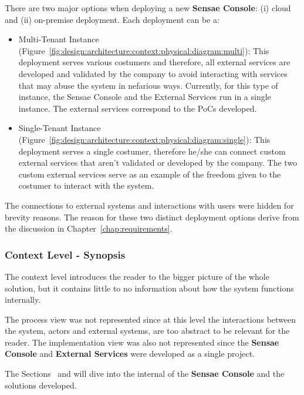 There are two major options when deploying a new \textbf{Sensae Console}: (i) cloud and (ii) on-premise deployment.
Each deployment can be a:

\begin{itemize}
   \item Multi-Tenant Instance (Figure~\ref{fig:design:architecture:context:physical:diagram:multi}): This deployment serves various costumers and therefore, all external services are developed and validated by the company to avoid interacting with services that may abuse the system in nefarious ways. Currently, for this type of instance, the Sensae Console and the External Services run in a single instance. The external services correspond to the \gls{PoC}s developed.
   \item Single-Tenant Instance (Figure~\ref{fig:design:architecture:context:physical:diagram:single}): This deployment serves a single costumer, therefore he/she can connect custom external services that aren't validated or developed by the company. The two custom external services serve as an example of the freedom given to the costumer to interact with the system. 
\end{itemize}

The connections to external systems and interactions with users were hidden for brevity reasons. The reason for these two distinct deployment options derive from the discussion in Chapter~\ref{chap:requirements}.  

\subsubsection{Context Level - Synopsis}
\label{subsubsec:design:architecture:context:synopsis}

The context level introduces the reader to the bigger picture of the whole solution, but it contains little to no information about how the system functions internally.

The process view was not represented since at this level the interactions between the system, actors and external systems, are too abstract to be relevant for the reader.
The implementation view was also not represented since the \textbf{Sensae Console} and \textbf{External Services} were developed as a single project.

The Sections~ and  will dive into the internal of the \textbf{Sensae Console} and the solutions developed.

